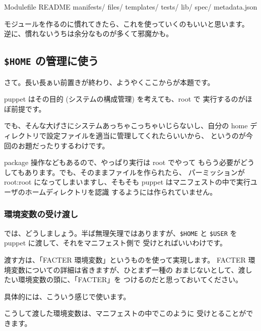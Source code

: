 \documentclass[mingoth,a4paper]{jsarticle}
\begin{document}
\begin{commandline} 
Modulefile
README
manifests/
files/
templates/
tests/
lib/
spec/
metadata.json
\end{commandline}

モジュールを作るのに慣れてきたら、これを使っていくのもいいと思います。
逆に、慣れないうちは余分なものが多くて邪魔かも。

\subsection{ {\tt \$HOME} の管理に使う}

さて。長い長ぁい前置きが終わり、ようやくここからが本題です。

puppet はその目的 (システムの構成管理) を考えても、root で
実行するのがほぼ前提です。

でも、そんな大げさにシステムあっちゃこっちゃいじらないし、自分の
home ディレクトリで設定ファイルを適当に管理してくれたらいいから、
というのが今回のお題だったりするわけです。

package 操作などもあるので、やっぱり実行は root でやって
もらう必要がどうしてもあります。でも、そのままファイルを作られたら、
パーミッションが root:root になってしまいますし、そもそも
puppet はマニフェストの中で実行ユーザのホームディレクトリを認識
するようには作られていません。

\subsubsection{環境変数の受け渡し}

では、どうしましょう。半ば無理矢理ではありますが、{\tt \$HOME}
と {\tt \$USER} を puppet に渡して、それをマニフェスト側で
受けとればいいわけです。

渡す方は、「FACTER 環境変数」というものを使って実現します。
FACTER 環境変数についての詳細は省きますが、ひとまず一種の
おまじないとして、渡したい環境変数の頭に、「FACTER\textunderscore」を
つけるのだと思っておいてください。

具体的には、こういう感じで使います。


こうして渡した環境変数は、マニフェストの中でこのように
受けとることができます。

\end{document}
